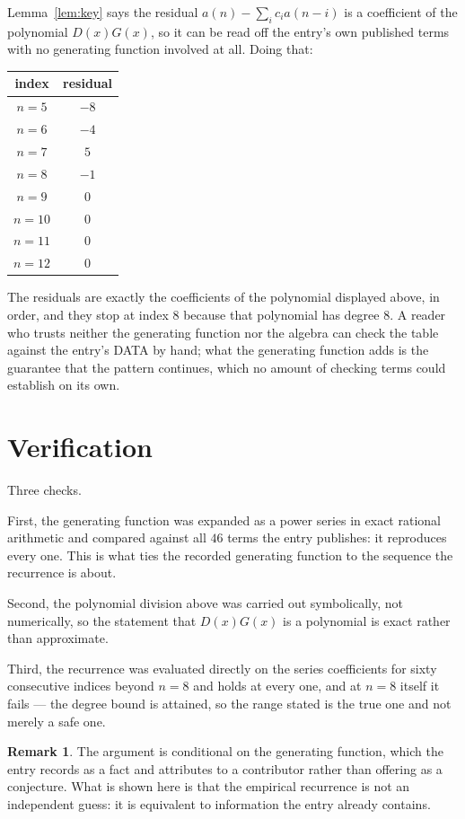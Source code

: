 \documentclass[11pt,a4paper]{article}
\theoremstyle{plain}
\theoremstyle{definition}
\newtheorem{remark}[theorem]{Remark}
\begin{document}
Lemma~\ref{lem:key} says the residual $a(n)-\sum_ic_ia(n-i)$ is a coefficient of the
polynomial $D(x)G(x)$, so it can be read off the entry's own published terms with no
generating function involved at all. Doing that:
\begin{center}
\begin{tabular}{cc}
index & residual \\ \hline
$n=5$ & $-8$ \\
$n=6$ & $-4$ \\
$n=7$ & $5$ \\
$n=8$ & $-1$ \\
$n=9$ & $0$ \\
$n=10$ & $0$ \\
$n=11$ & $0$ \\
$n=12$ & $0$
\end{tabular}
\end{center}
The residuals are exactly the coefficients of the polynomial displayed above, in order, and
they stop at index $8$ because that polynomial has degree $8$. A reader who trusts
neither the generating function nor the algebra can check the table against the entry's DATA
by hand; what the generating function adds is the guarantee that the pattern continues, which
no amount of checking terms could establish on its own.

\section{Verification}

Three checks.

First, the generating function was expanded as a power series in exact rational arithmetic and
compared against all $46$ terms the entry publishes: it reproduces every one. This is
what ties the recorded generating function to the sequence the recurrence is about.

Second, the polynomial division above was carried out symbolically, not numerically, so the
statement that $D(x)G(x)$ is a polynomial is exact rather than approximate.

Third, the recurrence was evaluated directly on the series coefficients for sixty consecutive
indices beyond $n=8$ and holds at every one, and at $n=8$ itself it fails --- the
degree bound is attained, so the range stated is the true one and not merely a safe one.

\begin{remark}
The argument is conditional on the generating function, which the entry records as a fact and
attributes to a contributor rather than offering as a conjecture. What is shown here is that
the empirical recurrence is not an independent guess: it is equivalent to information the
entry already contains.
\end{remark}
\end{document}
